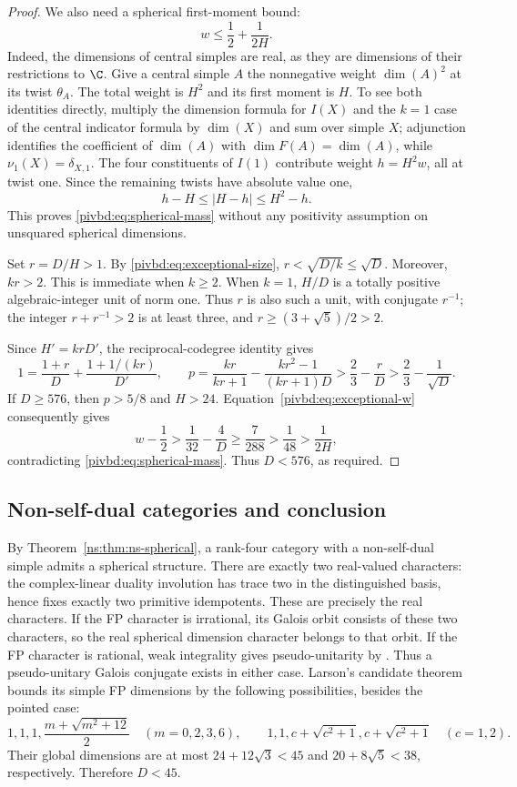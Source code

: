 \begin{proof}
We also need a spherical first-moment bound:
\begin{equation}\label{pivbd:eq:spherical-mass}
 w\leq\frac12+\frac1{2H}.
\end{equation}
Indeed, the dimensions of central simples are real, as they are dimensions of their restrictions to $\C$. Give a central simple $A$ the nonnegative weight $\dim(A)^2$ at its twist $\theta_A$. The total weight is $H^2$ and its first moment is $H$. To see both identities directly, multiply the dimension formula for $I(X)$ and the $k=1$ case of the central indicator formula by $\dim(X)$ and sum over simple $X$; adjunction identifies the coefficient of $\dim(A)$ with $\dim F(A)=\dim(A)$, while $\nu_1(X)=\delta_{X,1}$. The four constituents of $I(1)$ contribute weight $h=H^2w$, all at twist one. Since the remaining twists have absolute value one,
\[
 h-H\leq|H-h|\leq H^2-h.
\]
This proves \eqref{pivbd:eq:spherical-mass} without any positivity assumption on unsquared spherical dimensions.

Set $r=D/H>1$. By \eqref{pivbd:eq:exceptional-size}, $r<\sqrt{D/k}\leq\sqrt D$. Moreover, $kr>2$. This is immediate when $k\geq2$. When $k=1$, $H/D$ is a totally positive algebraic-integer unit of norm one. Thus $r$ is also such a unit, with conjugate $r^{-1}$; the integer $r+r^{-1}>2$ is at least three, and $r\geq(3+\sqrt5)/2>2$.

Since $H'=krD'$, the reciprocal-codegree identity gives
\[
 1=\frac{1+r}{D}+\frac{1+1/(kr)}{D'},\qquad
 p=\frac{kr}{kr+1}-\frac{kr^2-1}{(kr+1)D}
 >\frac23-\frac rD>\frac23-\frac1{\sqrt D}.
\]
If $D\geq576$, then $p>5/8$ and $H>24$. Equation~\eqref{pivbd:eq:exceptional-w} consequently gives
\[
 w-\frac12>\frac1{32}-\frac4D
 \geq\frac7{288}>\frac1{48}>\frac1{2H},
\]
contradicting \eqref{pivbd:eq:spherical-mass}. Thus $D<576$, as required.
\end{proof}


\subsection{Non-self-dual categories and conclusion}

By Theorem~\ref{ns:thm:ns-spherical}, a rank-four category with a
non-self-dual simple admits a spherical structure. There are exactly
two real-valued characters: the complex-linear duality involution has
trace two in the distinguished basis, hence fixes exactly two primitive
idempotents. These are precisely the real characters. If the FP
character is irrational, its Galois orbit consists of these two
characters, so the real spherical dimension character belongs to that
orbit. If the FP character is rational, weak integrality gives
pseudo-unitarity by \cite[Proposition~8.24]{ENO}.
Thus a pseudo-unitary Galois conjugate exists in either case.
Larson's candidate theorem \cite[Theorem~1.1]{Larson} bounds its simple
FP dimensions by the following possibilities, besides the pointed case:
\[
1,1,1,\frac{m+\sqrt{m^2+12}}2\quad(m=0,2,3,6),\qquad
1,1,c+\sqrt{c^2+1},c+\sqrt{c^2+1}\quad(c=1,2).
\]
Their global dimensions are at most $24+12\sqrt3<45$ and
$20+8\sqrt5<38$, respectively. Therefore $D<45$.

